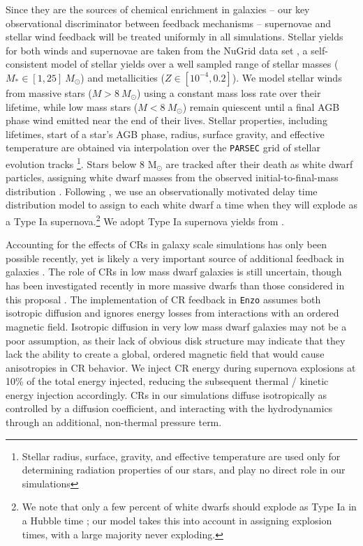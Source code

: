 \documentclass[11pt]{article}
\newcommand{\eg}{e.g.,}
\begin{document}
Since they are the sources of chemical enrichment in galaxies -- our key observational discriminator between feedback mechanisms -- supernovae and stellar wind feedback will be treated uniformly in all simulations. Stellar yields for both winds and supernovae are taken from the NuGrid data set \citep[][, Ritter et. al. in prep]{Pignatari2016}, a self-consistent model of stellar yields over a well sampled range of stellar masses ($M_{*} \in [1,25]~M_{\odot}$) and metallicities ($Z\in [10^{-4},0.2]$). We model stellar winds from massive stars ($M > 8~M_{\odot}$) using a constant mass loss rate over their lifetime, while low mass stars ($M < 8~M_{\odot}$) remain quiescent until a final AGB phase wind emitted near the end of their lives. Stellar properties, including lifetimes,  start of a star's AGB phase, radius, surface gravity, and effective temperature are obtained via interpolation over the \texttt{PARSEC} grid of stellar evolution tracks \citep{Bressan2012}\footnote{Stellar radius, surface, gravity, and effective temperature are used only for determining radiation properties of our stars, and play no direct role in our simulations}. Stars below 8 M$_{\odot}$ are tracked after their death as white dwarf particles, assigning white dwarf masses from the observed initial-to-final-mass distribution \citep{Salaris2009}. Following \citep{Cote2015}, we use an observationally motivated delay time distribution model \citep[\eg][]{Maoz2014} to assign to each white dwarf a time when they will explode as a Type Ia supernova.\footnote{We note that only a few percent of white dwarfs should explode as Type Ia in a Hubble time \citep{Maoz2014}; our model takes this into account in assigning explosion times, with a large majority never exploding.} We adopt Type Ia supernova yields from \cite{Thielemann1986}.

Accounting for the effects of CRs in galaxy scale simulations has only been possible recently, yet is likely a very important source of additional feedback in galaxies \citep[\eg][]{SalemBryan2014, SalemBryanHummels, SalemBryanCorlies, GirichidisCR, Pakmor2016, Simpson2016}. The role of CRs in low mass dwarf galaxies is still uncertain, though has been investigated recently in more massive dwarfs than those considered in this proposal \citep{Chen2016}. The implementation of CR feedback in \texttt{Enzo} \citep{SalemBryan2014} assumes both isotropic diffusion and ignores energy losses from interactions with an ordered magnetic field. Isotropic diffusion in very low mass dwarf galaxies may not be a poor assumption, as their lack of obvious disk structure may indicate that they lack the ability to create a global, ordered magnetic field that would cause anisotropies in CR behavior. We inject CR energy during supernova explosions at 10\% of the total energy injected, reducing the subsequent thermal / kinetic energy injection accordingly. CRs in our simulations diffuse isotropically as controlled by a diffusion coefficient, and interacting with the hydrodynamics through an additional, non-thermal pressure term.
\end{document}
